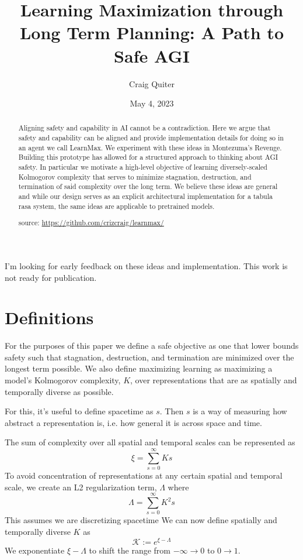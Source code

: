 \documentclass{article}
\title{Learning Maximization through Long Term Planning: A Path to Safe AGI}
\author{Craig Quiter}
\date{May 4, 2023}
\begin{document}
\maketitle

\begin{tcolorbox}
I'm looking for early feedback on these ideas and implementation. This work is not ready for publication.
\end{tcolorbox}

\begin{abstract}
Aligning safety and capability in AI cannot be a contradiction.
Here we argue that safety and capability can be aligned and provide implementation details for doing so in an agent we call LearnMax. We experiment with these ideas in Montezuma's Revenge. Building this prototype has allowed for a structured approach to thinking about AGI safety. In particular we motivate a high-level objective of learning diversely-scaled Kolmogorov complexity that serves to minimize stagnation, destruction, and termination of said complexity over the long term. We believe these ideas are general and while our design serves as an explicit architectural implementation for a tabula rasa system, the same ideas are applicable to pretrained models.

source: \href{https://github.com/crizcraig/learnmax/}{https://github.com/crizcraig/learnmax/}
\end{abstract}

\setcounter{secnumdepth}{-1}

\section{Definitions}

For the purposes of this paper we define a safe objective as one that lower bounds safety such that stagnation, destruction, and termination are minimized over the longest term possible.  We also define maximizing learning as maximizing a model's Kolmogorov complexity\cite{li2008introduction}, $K$, over representations that are as spatially and temporally diverse as possible.

For this, it's useful to define spacetime as $s$. Then $s$ is a way of measuring how abstract a representation is, i.e. how general it is across space and time.

The sum of complexity over all spatial and temporal scales can be represented as
\[
\xi = \sum_{s=0}^{\infty}K s
\]
To avoid concentration of representations at any certain spatial and temporal scale, we create an L2 regularization term, $\Lambda$ where
\[
\Lambda = \sum_{s=0}^{\infty}K^{2} s
\]
This assumes we are discretizing spacetime
We can now define spatially and temporally diverse $K$ as
\[
\mathcal{K}:= e^{\xi - \Lambda}
\]
We exponentiate $\xi - \Lambda$ to shift the range from $-\infty\to0$ to $0\to1$.
\end{document}
